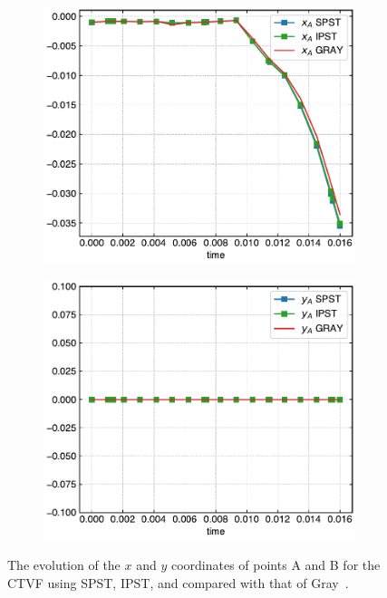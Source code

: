 \documentclass[preprint,12pt]{elsarticle}
\begin{document}
\begin{figure}[!htpb]
  \centering
  \begin{subfigure}{0.48\textwidth}
    \centering
    \includegraphics[width=1\linewidth]{fig_29_a}
    \label{fig:rings-compare-x}
  \end{subfigure}
  \begin{subfigure}{0.48\textwidth}
    \centering
    \includegraphics[width=1\linewidth]{fig_29_b}
    \label{fig:rings-compare-y}
  \end{subfigure}
  \caption{The evolution of the $x$ and $y$ coordinates of points A and B for
    the CTVF using SPST, IPST, and compared with that of
    Gray~\cite{gray-ed-2001}.}
\label{fig:rings_compare}
\end{figure}
\end{document}
